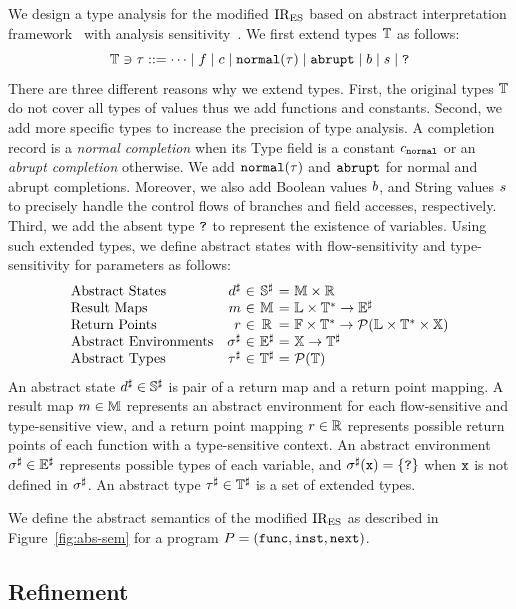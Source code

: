 We design a type analysis for the modified ${\text{IR}_\text{ES}}$ based on abstract
interpretation framework~\cite{ai1977, ai1992} with analysis
sensitivity~\cite{sens-toplas}.  We first extend types $\mathbb{T}$ as follows:
\[
  \mathbb{T} \ni \tau ::=
  \cdots \mid
  f \mid
  c \mid
  \texttt{normal}(\tau) \mid
  \texttt{abrupt} \mid
  b \mid
  s \mid
  \texttt{?}
\]
There are three different reasons why we extend types.  First, the original
types $\mathbb{T}$ do not cover all types of values thus we add functions and
constants.  Second, we add more specific types to increase the precision of type
analysis.  A completion record is a \textit{normal completion} when its Type
field is a constant $c_{\texttt{normal}}$ or an \textit{abrupt completion}
otherwise.  We add $\texttt{normal}(\tau)$ and $\texttt{abrupt}$ for normal and abrupt
completions.  Moreover, we also add Boolean values $b$, and String values
$s$ to precisely handle the control flows of branches and field accesses,
respectively.  Third, we add the absent type $\texttt{?}$ to represent the
existence of variables.  Using such extended types, we define abstract states
with flow-sensitivity and type-sensitivity for parameters as follows:
\[
  \begin{array}{lr@{~}c@{~}c@{~}r@{~}l}
    \text{Abstract States}
    &\aelem&\in&\adom&=& \rmapset \times \retpset\\

    \text{Result Maps}
    &\rmap&\in&\rmapset&=& \labset \times \tyset^* \rightarrow \aenvset\\

    \text{Return Points}
    &\retp&\in&\retpset&=& \funcset \times \tyset^*
    \rightarrow \partsof{\labset \times \tyset^* \times \varset} \\

    \text{Abstract Environments}
    &\aenv&\in&\aenvset&=&\varset \rightarrow \atyset\\

    \text{Abstract Types}
    &\aty&\in&\atyset&=&\partsof{\tyset}\\
  \end{array}
\]
An abstract state ${d}^\sharp \in {\mathbb{S}}^\sharp$ is pair of a return map and a return point
mapping.  A result map $m \in \mathbb{M}$ represents an abstract environment
for each flow-sensitive and type-sensitive view, and a return point mapping
$r \in \mathbb{R}$ represents possible return points of each function with
a type-sensitive context.  An abstract environment ${\sigma}^\sharp \in {\mathbb{E}}^\sharp$
represents possible types of each variable, and ${\sigma}^\sharp(\texttt{x}) = \{ \texttt{?} \}$
when $\texttt{x}$ is not defined in ${\sigma}^\sharp$.  An abstract type $\tau^\sharp \in \mathbb{T}^\sharp$ is a
set of extended types.

We define the abstract semantics of the modified ${\text{IR}_\text{ES}}$ as described in
Figure~\ref{fig:abs-sem} for a program $P = (\mathtt{func}, \mathtt{inst},
\mathtt{next})$.


\subsection{Refinement}\label{sec:refine}
